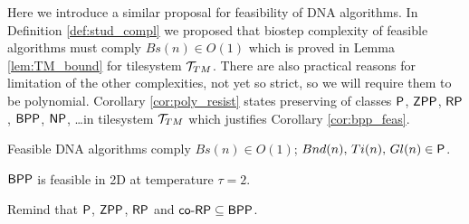 	Here we introduce a similar proposal for feasibility of DNA algorithms. In Definition \ref{def:stud_compl} we proposed that biostep complexity of feasible algorithms must comply $Bs(n)\in O(1)$ which is proved in Lemma \ref{lem:TM_bound} for tilesystem ${\cal T}_{TM}$. There are also practical reasons for limitation of the other complexities, not yet so strict, so we will require them to be polynomial. Corollary \ref{cor:poly_resist} states preserving of classes $\P$, $\ZPP$, $\RP$, $\BPP$, $\NP$, \ldots in tilesystem ${\cal T}_{TM}$ which justifies Corollary \ref{cor:bpp_feas}.
	
	\begin{thesis}   %
		Feasible DNA algorithms comply $Bs(n)\in O(1)$; $Bnd(n),\,Ti(n),\,Gl(n)\in \P$.   %
	\end{thesis}
	
	\begin{cor}
	\label{cor:bpp_feas}
		$\BPP$ is feasible in 2D at temperature $\tau=2$.
	\end{cor}
	
	\begin{note}
		Remind that $\P$, $\ZPP$, $\RP$ and $\coRP \subseteq \BPP$.
	\end{note}
	
	
	
	
	
	
	
